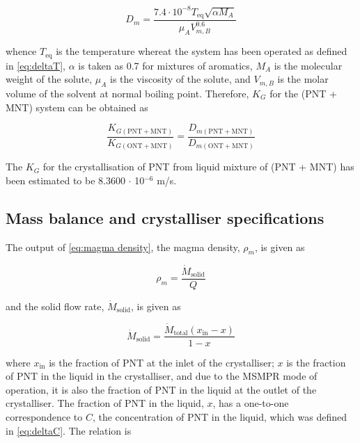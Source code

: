 \begin{equation}
    D_m = \frac{7.4 \cdot 10^{-8} T_{\mathrm{eq}} \sqrt{\alpha M_A}}{\mu_A V_{m,B}^0.6}
\end{equation}

\noindent whence $T_{\mathrm{eq}}$ is the temperature whereat the system has been operated as defined in \cref{eq:deltaT}, $\alpha$ is taken as 0.7 for mixtures of aromatics, $M_A$ is the molecular weight of the solute, $\mu_A$ is the viscosity of the solute, and $V_{m,B}$ is the molar volume of the solvent at normal boiling point. Therefore, $K_G$ for the (PNT + MNT) system can be obtained as 

\begin{equation} \label{eq:ratio of growth kinetics}
    \frac{K_{G\mathrm{(PNT + MNT)}}}{K_{G\mathrm{(ONT + MNT)}}} = \frac{D_{m\mathrm{(PNT + MNT)}}}{D_{m\mathrm{(ONT + MNT)}}}
\end{equation}

\noindent The $K_G$ for the crystallisation of PNT from liquid mixture of (PNT + MNT) has been estimated to be 8.3600 $\cdot$ 10$^{-6}$ m/s. 

\subsection{Mass balance and crystalliser specifications} \label{sec: crystalliser mass balance}

The output of \cref{eq:magma density}, the magma density, $\rho_m$, is given as 

\begin{equation}
    \rho_m = \frac{\dot{M}_{\mathrm{solid}}}{Q}
\end{equation}

\noindent and the solid flow rate, $\dot{M}_{\mathrm{solid}}$, is given as

\begin{equation}
    \dot{M}_{\mathrm{solid}} = \frac{\dot{M}_{\mathrm{total}} (x_{\mathrm{in}} - x)}{1 - x}
\end{equation}

\noindent where $x_{\mathrm{in}}$ is the fraction of PNT at the inlet of the crystalliser; $x$ is the fraction of PNT in the liquid in the crystalliser, and due to the MSMPR mode of operation, it is also the fraction of PNT in the liquid at the outlet of the crystalliser. The fraction of PNT in the liquid, $x$, has a one-to-one correspondence to $C$, the concentration of PNT in the liquid, which was defined in \cref{eq:deltaC}. The relation is 

